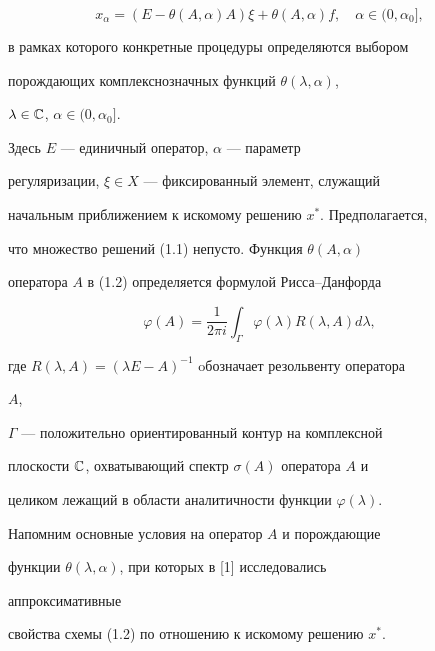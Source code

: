 \begin{equation}


x_\alpha=(E-\theta(A,\alpha)A)\xi+\theta(A,\alpha)f,\quad


\alpha\in(0,\alpha_0],


\end{equation}


в рамках которого конкретные процедуры определяются выбором


порождающих комплекснозначных функций $\theta(\lambda,\alpha)$, 


$\lambda\in\Bbb C$, $\alpha\in(0,\alpha_0]$.


Здесь $E$ --- единичный оператор, $\alpha$ --- параметр 


регуляризации, $\xi\in X$ --- фиксированный элемент, служащий 


начальным приближением к искомому решению $x^*$. Предполагается, 


что множество решений (1.1) непусто. Функция $\theta(A,\alpha)$


оператора $A$ в (1.2) определяется формулой Рисса--Данфорда


\begin{equation}


\varphi(A)=\frac{1}{2\pi i}\int_\Gamma\varphi(\lambda)


R(\lambda,A)d\lambda,


\end{equation}


где $R(\lambda,A)=(\lambda E-A)^{-1}$ oбозначает резольвенту оператора 


$A$,


$\Gamma$ --- положительно ориентированный контур на комплексной 


плоскости $\Bbb C$, охватывающий спектр $\sigma(A)$ оператора $A$ и 


целиком лежащий в области аналитичности функции $\varphi(\lambda)$.





Напомним основные условия на оператор $A$ и порождающие 


функции $\theta(\lambda,\alpha)$, при которых в [1] исследовались 


аппроксимативные 


свойства схемы (1.2) по отношению к искомому решению $x^*$.


\medskip





